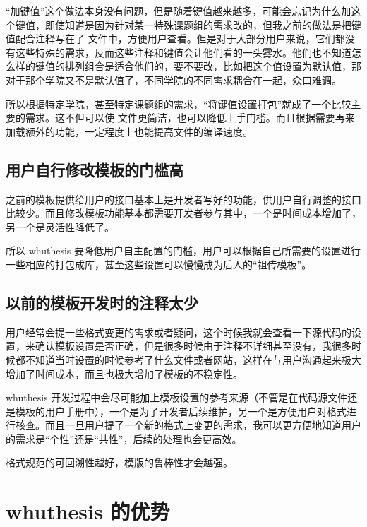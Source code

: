 “加键值”这个做法本身没有问题，但是随着键值越来越多，可能会忘记为什么加这个键值，即使知道是因为针对某一特殊课题组的需求改的，但我之前的做法是把键值配合注释写在了  文件中，方便用户查看。但是对于大部分用户来说，它们都没有这些特殊的需求，反而这些注释和键值会让他们看的一头雾水。他们也不知道怎么样的键值的排列组合是适合他们的，要不要改，比如把这个值设置为默认值，那对于那个学院又不是默认值了，不同学院的不同需求耦合在一起，众口难调。

所以根据特定学院，甚至特定课题组的需求，“将键值设置打包”就成了一个比较主要的需求。这不但可以使  文件更简洁，也可以降低上手门槛。而且根据需要再来加载额外的功能，一定程度上也能提高文件的编译速度。



\subsection{用户自行修改模板的门槛高}

之前的模板提供给用户的接口基本上是开发者写好的功能，供用户自行调整的接口比较少。而且修改模板功能基本都需要开发者参与其中，一个是时间成本增加了，另一个是灵活性降低了。

所以 whuthesis 要降低用户自主配置的门槛，用户可以根据自己所需要的设置进行一些相应的打包成库，甚至这些设置可以慢慢成为后人的“祖传模板”。


\subsection{以前的模板开发时的注释太少}

用户经常会提一些格式变更的需求或者疑问，这个时候我就会查看一下源代码的设置，来确认模板设置是否正确，但是很多时候由于注释不详细甚至没有，我很多时候都不知道当时设置的时候参考了什么文件或者网站，这样在与用户沟通起来极大增加了时间成本，而且也极大增加了模板的不稳定性。

whuthesis 开发过程中会尽可能加上模板设置的参考来源（不管是在代码源文件还是模板的用户手册中），一个是为了开发者后续维护，另一个是方便用户对格式进行核查。而且一旦用户提了一个新的格式上变更的需求，我可以更方便地知道用户的需求是“个性”还是“共性”，后续的处理也会更高效。

格式规范的可回溯性越好，模版的鲁棒性才会越强。



\section{whuthesis 的优势}

